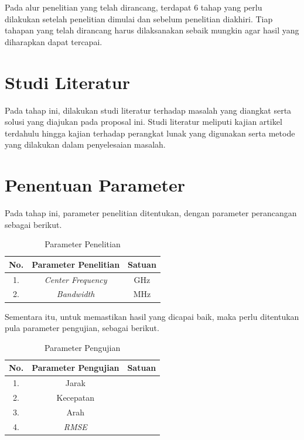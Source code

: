 Pada alur penelitian yang telah dirancang, terdapat 6 tahap yang perlu dilakukan setelah penelitian dimulai dan sebelum penelitian diakhiri. Tiap tahapan yang telah dirancang harus dilaksanakan sebaik mungkin agar hasil yang diharapkan dapat tercapai.


\section{Studi Literatur}
Pada tahap ini, dilakukan studi literatur terhadap masalah yang diangkat serta solusi yang diajukan pada proposal ini. Studi literatur meliputi kajian artikel terdahulu hingga kajian terhadap perangkat lunak yang digunakan serta metode yang dilakukan dalam penyelesaian masalah.
	
\section{Penentuan Parameter}

Pada tahap ini, parameter penelitian ditentukan, dengan parameter perancangan sebagai berikut.

\begin{center}
	\begin{longtable}{| c | c | c |}
		\caption{Parameter Penelitian}
		\label{tab:param}\\
		\hline
		No. & Parameter Penelitian 			& Satuan\\ \hline
		1.  &\textit{Center Frequency}	   	& GHz\\
		2.  &\textit{Bandwidth} 			& MHz \\
		\hline
	\end{longtable}
\end{center}

Sementara itu, untuk memastikan hasil yang dicapai baik, maka perlu ditentukan pula parameter pengujian, sebagai berikut.

\begin{center}
	\begin{longtable}{| c | c | c |}
		\caption{Parameter Pengujian}
		\label{tab:paramUji}\\
		\hline
		No. & Parameter Pengujian		& Satuan\\ \hline
		1.  &Jarak	   					& \\
		2.  &Kecepatan 					&  \\
		3.  &Arah						& \\
		4.  &\textit{RMSE}				&  \\
		\hline
	\end{longtable}
\end{center}

